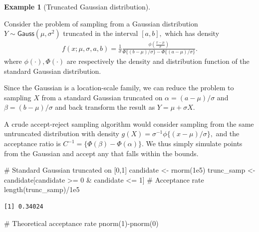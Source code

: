 \documentclass[
  11pt,
  letterpaper,
]{scrbook}
\newenvironment{Shaded}{\begin{snugshade}}{\end{snugshade}}
\newcommand{\CommentTok}[1]{\textcolor[rgb]{0.37,0.37,0.37}{#1}}
\newcommand{\DecValTok}[1]{\textcolor[rgb]{0.68,0.00,0.00}{#1}}
\newcommand{\FloatTok}[1]{\textcolor[rgb]{0.68,0.00,0.00}{#1}}
\newcommand{\FunctionTok}[1]{\textcolor[rgb]{0.28,0.35,0.67}{#1}}
\newcommand{\NormalTok}[1]{\textcolor[rgb]{0.00,0.23,0.31}{#1}}
\newcommand{\OtherTok}[1]{\textcolor[rgb]{0.00,0.23,0.31}{#1}}
\newcommand{\SpecialCharTok}[1]{\textcolor[rgb]{0.37,0.37,0.37}{#1}}
\theoremstyle{definition}
\newtheorem{example}{Example}[chapter]
\theoremstyle{plain}
\theoremstyle{plain}
\theoremstyle{plain}
\theoremstyle{definition}
\theoremstyle{definition}
\theoremstyle{plain}
\theoremstyle{plain}
\theoremstyle{remark}
\begin{document}
\begin{example}[Truncated Gaussian
distribution]\protect\hypertarget{exm-accept-reject-truncated}{}\label{exm-accept-reject-truncated}

Consider the problem of sampling from a Gaussian distribution
\(Y \sim \mathsf{Gauss}(\mu, \sigma^2)\) truncated in the interval
\([a, b],\) which has density \begin{align*}
f(x; \mu, \sigma, a, b) = \frac{1}{\sigma}\frac{\phi\left(\frac{x-\mu}{\sigma}\right)}{\Phi\{(b-\mu)/\sigma\}-\Phi\{(a-\mu)/\sigma\}}.
\end{align*} where \(\phi(\cdot), \Phi(\cdot)\) are respectively the
density and distribution function of the standard Gaussian distribution.

Since the Gaussian is a location-scale family, we can reduce the problem
to sampling \(X\) from a standard Gaussian truncated on
\(\alpha = (a-\mu)/\sigma\) and \(\beta = (b-\mu)/\sigma\) and back
transform the result as \(Y = \mu + \sigma X.\)

A crude accept-reject sampling algorithm would consider sampling from
the same untruncated distribution with density
\(g(X) = \sigma^{-1}\phi\{(x-\mu)/\sigma\},\) and the acceptance ratio
is \(C^{-1}=\{\Phi(\beta) - \Phi(\alpha)\}.\) We thus simply simulate
points from the Gaussian and accept any that falls within the bounds.

\begin{Shaded}
\begin{Highlighting}[]
\CommentTok{\# Standard Gaussian truncated on [0,1]}
\NormalTok{candidate }\OtherTok{\textless{}{-}} \FunctionTok{rnorm}\NormalTok{(}\FloatTok{1e5}\NormalTok{)}
\NormalTok{trunc\_samp }\OtherTok{\textless{}{-}}\NormalTok{ candidate[candidate }\SpecialCharTok{\textgreater{}=} \DecValTok{0} \SpecialCharTok{\&}\NormalTok{ candidate }\SpecialCharTok{\textless{}=} \DecValTok{1}\NormalTok{]}
\CommentTok{\# Acceptance rate}
\FunctionTok{length}\NormalTok{(trunc\_samp)}\SpecialCharTok{/}\FloatTok{1e5}
\end{Highlighting}
\end{Shaded}

\begin{verbatim}
[1] 0.34024
\end{verbatim}

\begin{Shaded}
\begin{Highlighting}[]
\CommentTok{\# Theoretical acceptance rate}
\FunctionTok{pnorm}\NormalTok{(}\DecValTok{1}\NormalTok{)}\SpecialCharTok{{-}}\FunctionTok{pnorm}\NormalTok{(}\DecValTok{0}\NormalTok{)}
\end{Highlighting}
\end{Shaded}


\end{example}
\end{document}
